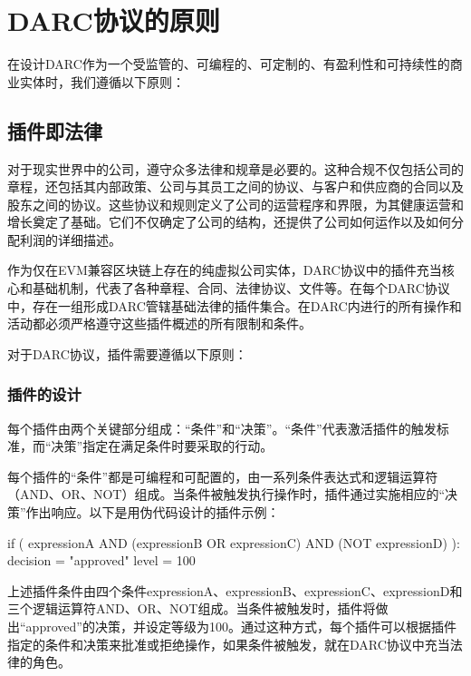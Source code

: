 \documentclass[main.tex]{subfiles}
\begin{document}
\section{DARC协议的原则}

在设计DARC作为一个受监管的、可编程的、可定制的、有盈利性和可持续性的商业实体时，我们遵循以下原则：

\subsection{插件即法律}

对于现实世界中的公司，遵守众多法律和规章是必要的。这种合规不仅包括公司的章程，还包括其内部政策、公司与其员工之间的协议、与客户和供应商的合同以及股东之间的协议。这些协议和规则定义了公司的运营程序和界限，为其健康运营和增长奠定了基础。它们不仅确定了公司的结构，还提供了公司如何运作以及如何分配利润的详细描述。

作为仅在EVM兼容区块链上存在的纯虚拟公司实体，DARC协议中的插件充当核心和基础机制，代表了各种章程、合同、法律协议、文件等。在每个DARC协议中，存在一组形成DARC管辖基础法律的插件集合。在DARC内进行的所有操作和活动都必须严格遵守这些插件概述的所有限制和条件。

对于DARC协议，插件需要遵循以下原则：

\subsubsection{插件的设计}

每个插件由两个关键部分组成：“条件”和“决策”。“条件”代表激活插件的触发标准，而“决策”指定在满足条件时要采取的行动。

每个插件的“条件”都是可编程和可配置的，由一系列条件表达式和逻辑运算符（AND、OR、NOT）组成。当条件被触发执行操作时，插件通过实施相应的“决策”作出响应。以下是用伪代码设计的插件示例：

\begin{spverbatim}

if ( 
    expressionA AND
    (expressionB OR expressionC) AND
    (NOT expressionD)
   ):
    decision = "approved"
    level = 100

\end{spverbatim}

上述插件条件由四个条件expressionA、expressionB、expressionC、expressionD和三个逻辑运算符AND、OR、NOT组成。当条件被触发时，插件将做出“approved”的决策，并设定等级为100。通过这种方式，每个插件可以根据插件指定的条件和决策来批准或拒绝操作，如果条件被触发，就在DARC协议中充当法律的角色。
\end{document}
